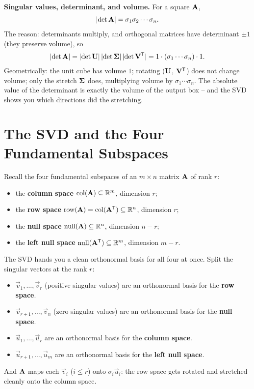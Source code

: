 \begin{connectionbox}
\textbf{Singular values, determinant, and volume.} For a square $\mathbf{A}$,
\[
  \lvert\det\mathbf{A}\rvert = \sigma_1\sigma_2\cdots\sigma_n.
\]
The reason: determinants multiply, and orthogonal matrices have
determinant $\pm 1$ (they preserve volume), so
\[
  \lvert\det\mathbf{A}\rvert = \lvert\det\mathbf{U}\rvert\,\lvert\det\mathbf{\Sigma}\rvert\,\lvert\det\mathbf{V}^{\mathsf{T}}\rvert
  = 1\cdot(\sigma_1\cdots\sigma_n)\cdot 1.
\]
Geometrically: the unit cube has
volume $1$; rotating ($\mathbf{U}$, $\mathbf{V}^{\mathsf{T}}$) does not change volume; only the
stretch $\mathbf{\Sigma}$ does, multiplying volume by $\sigma_1\cdots\sigma_n$. The
absolute value of the determinant is exactly the volume of the output box -- and
the SVD shows you which directions did the stretching.
\end{connectionbox}

\section{The SVD and the Four Fundamental Subspaces}
\label{ch29:four-subspaces}

Recall the four fundamental subspaces of an $m\times n$ matrix $\mathbf{A}$ of rank $r$:
\begin{itemize}
  \item the \textbf{column space} $\operatorname{col}(\mathbf{A}) \subseteq \mathbb{R}^m$, dimension $r$;
  \item the \textbf{row space} $\operatorname{row}(\mathbf{A}) = \operatorname{col}(\mathbf{A}^{\mathsf{T}}) \subseteq \mathbb{R}^n$, dimension $r$;
  \item the \textbf{null space} $\operatorname{null}(\mathbf{A}) \subseteq \mathbb{R}^n$, dimension $n-r$;
  \item the \textbf{left null space} $\operatorname{null}(\mathbf{A}^{\mathsf{T}}) \subseteq \mathbb{R}^m$, dimension $m-r$.
\end{itemize}
The SVD hands you a clean orthonormal basis for all four at once. Split the
singular vectors at the rank $r$:

\begin{focusbox}
\begin{itemize}
  \item $\vec{v}_1,\dots,\vec{v}_r$ (positive singular values) are an orthonormal
        basis for the \textbf{row space}.
  \item $\vec{v}_{r+1},\dots,\vec{v}_n$ (zero singular values) are an orthonormal
        basis for the \textbf{null space}.
  \item $\vec{u}_1,\dots,\vec{u}_r$ are an orthonormal basis for the
        \textbf{column space}.
  \item $\vec{u}_{r+1},\dots,\vec{u}_m$ are an orthonormal basis for the
        \textbf{left null space}.
\end{itemize}
And $\mathbf{A}$ maps each $\vec{v}_i$ ($i\le r$) onto $\sigma_i \vec{u}_i$: the row
space gets rotated and stretched cleanly onto the column space.
\end{focusbox}

